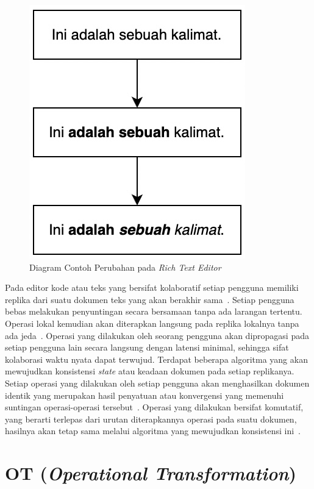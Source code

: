\begin{figure}
    \centering
    \includegraphics[scale=0.8]{assets/skripsi/richtext}
    \caption{Diagram Contoh Perubahan pada \textit{Rich Text Editor}}
    \label{fig:2:richtext}
\end{figure}

Pada editor kode atau teks yang bersifat kolaboratif setiap pengguna memiliki replika dari suatu dokumen teks yang akan berakhir sama~\citep{Sun1998, Sun2004}. Setiap pengguna bebas melakukan penyuntingan secara bersamaan tanpa ada larangan tertentu. Operasi lokal kemudian akan diterapkan langsung pada replika lokalnya tanpa ada jeda~\citep{attiya2016specification, Lv2015}. Operasi yang dilakukan oleh seorang pengguna akan dipropagasi pada setiap pengguna lain secara langsung dengan latensi minimal, sehingga sifat kolaborasi waktu nyata dapat terwujud. Terdapat beberapa algoritma yang akan mewujudkan konsistensi \textit{state} atau keadaan dokumen pada setiap replikanya. Setiap operasi yang dilakukan oleh setiap pengguna akan menghasilkan dokumen identik yang merupakan hasil penyatuan atau konvergensi yang memenuhi suntingan operasi-operasi tersebut~\citep{Sun1998, Sun2004, Sun2019First, Sun2019third}. Operasi yang dilakukan bersifat komutatif, yang berarti terlepas dari urutan diterapkannya operasi pada suatu dokumen, hasilnya akan tetap sama melalui algoritma yang mewujudkan konsistensi ini~\citep{Sun1998}.

\section{OT (\textit{Operational Transformation})}
\label{subsec:OT}

